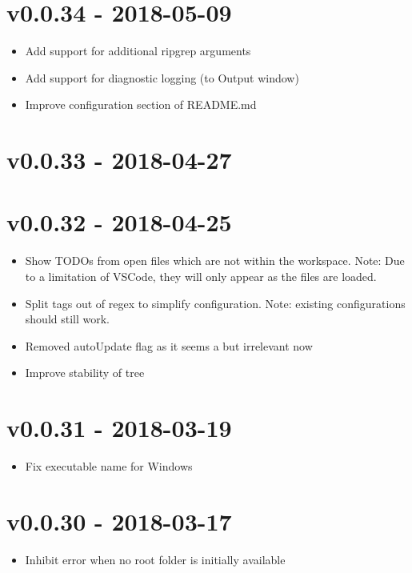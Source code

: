 \chapter{v0.0.34 - 2018-05-09}
\begin{itemize}
\item{Add support for additional ripgrep arguments}
\item{Add support for diagnostic logging (to Output window)}
\item{Improve configuration section of README.md}
\end{itemize}

\chapter{v0.0.33 - 2018-04-27}

\chapter{v0.0.32 - 2018-04-25}
\begin{itemize}
\item{Show TODOs from open files which are not within the workspace. Note: Due to a limitation of VSCode, they will only appear as the files are loaded.}
\item{Split tags out of regex to simplify configuration. Note: existing configurations should still work.}
\item{Removed autoUpdate flag as it seems a but irrelevant now}
\item{Improve stability of tree}
\end{itemize}

\chapter{v0.0.31 - 2018-03-19}
\begin{itemize}
\item{Fix executable name for Windows}
\end{itemize}

\chapter{v0.0.30 - 2018-03-17}
\begin{itemize}
\item{Inhibit error when no root folder is initially available}
\end{itemize}

